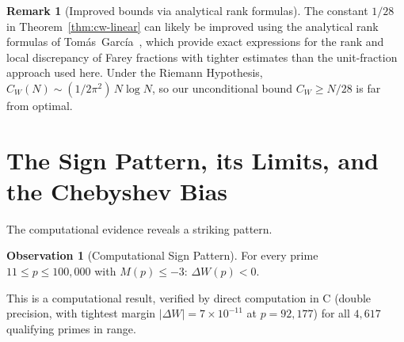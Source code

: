 \documentclass[11pt]{article}
\theoremstyle{definition}
\newtheorem{remark}[theorem]{Remark}
\newtheorem{observation}[theorem]{Observation}
\begin{document}
\begin{remark}[Improved bounds via analytical rank formulas]
The constant $1/28$ in Theorem~\ref{thm:cw-linear} can likely be improved
using the analytical rank formulas of Tom\'as~Garc\'ia~\cite{TomasGarcia2022, TomasGarcia2024, TomasGarcia2025},
which provide exact expressions for the rank and local discrepancy of Farey
fractions with tighter estimates than the unit-fraction approach used here.
Under the Riemann Hypothesis, $C_W(N) \sim (1/2\pi^2)\,N\log N$,
so our unconditional bound $C_W \ge N/28$ is far from optimal.
\end{remark}


\section{The Sign Pattern, its Limits, and the Chebyshev Bias}\label{sec:sign-theorem}

The computational evidence reveals a striking pattern.

\begin{observation}[Computational Sign Pattern]\label{thm:sign}
For every prime $11 \le p \le 100{,}000$ with $M(p) \le -3$:
$\Delta W(p) < 0$.
\end{observation}

\noindent This is a computational result, verified by direct
computation in C (double precision, with tightest margin
$|\Delta W| = 7 \times 10^{-11}$ at $p = 92{,}177$) for all
$4{,}617$ qualifying primes in range.
\end{document}
